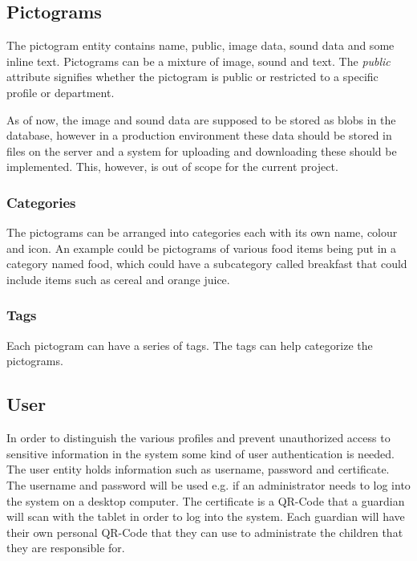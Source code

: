 \subsection{Pictograms}
The pictogram entity contains name, public, image data, sound data and some inline text. 
Pictograms can be a mixture of image, sound and text. The \emph{public} attribute signifies whether the pictogram is public or restricted to a specific profile or department. 

As of now, the image and sound data are supposed to be stored as blobs in the database, however in a production environment these data should be stored in files on the server and a system for uploading and downloading these should be implemented. This, however, is out of scope for the current project. 

\subsubsection{Categories}
The pictograms can be arranged into categories each with its own name, colour and icon.
An example could be pictograms of various food items being put in a category named food, which could have a subcategory called breakfast that could include items such as cereal and orange juice.

\subsubsection{Tags}
Each pictogram can have a series of tags. The tags can help categorize the pictograms.

\subsection{User}
In order to distinguish the various profiles and prevent unauthorized access to sensitive information in the system some kind of user authentication is needed. The user entity holds information such as username, password and certificate.
The username and password will be used e.g. if an administrator needs to log into the system on a desktop computer. The certificate is a QR-Code that a guardian will scan with the tablet in order to log into the system. Each guardian will have their own personal QR-Code that they can use to administrate the children that they are responsible for.